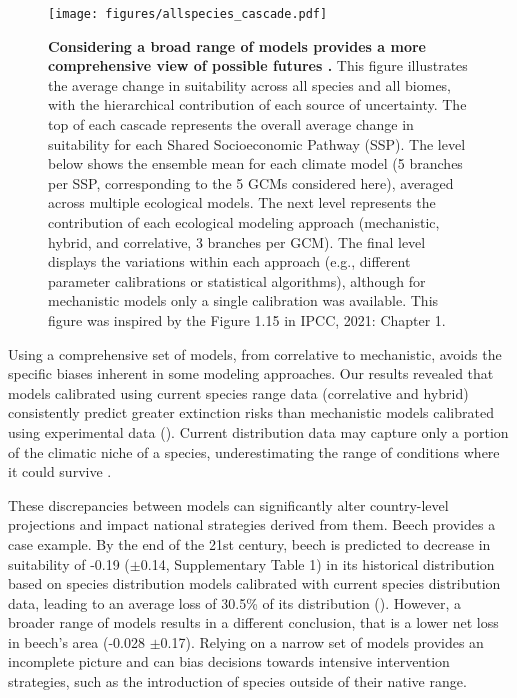\documentclass[11pt,letter]{article}
\begin{document}
\begin{figure}
	\centering
	\texttt{[image: figures/allspecies\_cascade.pdf]}
	\caption{\textbf{Considering a broad range of models provides a more comprehensive view of possible futures .} This figure illustrates the average change in suitability across all species and all biomes, with the hierarchical contribution of each source of uncertainty. The top of each cascade represents the overall average change in suitability for each Shared Socioeconomic Pathway (SSP). The level below shows the ensemble mean for each climate model (5 branches per SSP, corresponding to the 5 GCMs considered here), averaged across multiple ecological models. The next level represents the contribution of each ecological modeling approach (mechanistic, hybrid, and correlative, 3 branches per GCM). The final level displays the variations within each approach (e.g., different parameter calibrations or statistical algorithms), although for mechanistic models only a single calibration was available. This figure was inspired by the Figure 1.15 in IPCC, 2021: Chapter 1.}
	\label{fig:cascade}
\end{figure}

Using a comprehensive set of models, from correlative to mechanistic, avoids the specific biases inherent in some modeling approaches. Our results revealed that models calibrated using current species range data (correlative and hybrid) consistently predict greater extinction risks than mechanistic models calibrated using experimental data (). 
Current distribution data may capture only a portion of the climatic niche of a species, underestimating the range of conditions where it could survive \citep{Chevalier2024, NoguesBravo2016}.

These discrepancies between models can significantly alter country-level projections and impact national strategies derived from them. 
Beech provides a case example. By the end of the 21st century, beech is predicted to decrease in  suitability of -0.19 ($\pm$0.14, Supplementary Table 1) in its historical distribution based on species distribution models calibrated with current species distribution data, leading to an average loss of 30.5\% of its distribution (). However, a broader range of models results in a different conclusion, that is a lower net loss in beech's area (-0.028 $\pm$0.17).
Relying on a narrow set of models %
provides an incomplete picture \citep{Dawson2011} and can bias decisions towards intensive intervention strategies, such as the introduction of species outside of their native range.
\end{document}
